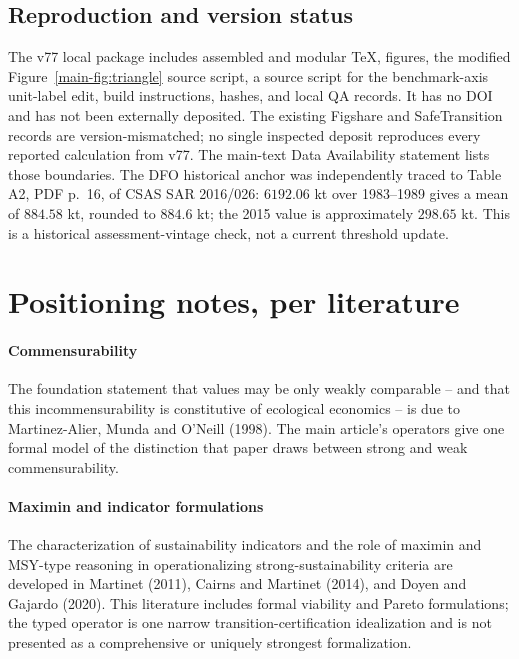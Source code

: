 \subsection{Reproduction and version status}

The v77 local package includes assembled and modular TeX, figures, the modified Figure~\ref{main-fig:triangle} source script, a source script for the benchmark-axis unit-label edit, build instructions, hashes, and local QA records. It has no DOI and has not been externally deposited. The existing Figshare and SafeTransition records are version-mismatched; no single inspected deposit reproduces every reported calculation from v77. The main-text Data Availability statement lists those boundaries. The DFO historical anchor was independently traced to Table A2, PDF p.~16, of CSAS SAR 2016/026: $6192.06$ kt over 1983--1989 gives a mean of $884.58$ kt, rounded to $884.6$ kt; the 2015 value is approximately $298.65$ kt. This is a historical assessment-vintage check, not a current threshold update.

\section{Positioning notes, per literature}\label{si:positioning}

\paragraph{Commensurability} The foundation statement that values may be only weakly comparable -- and that this incommensurability is constitutive of ecological economics -- is due to Martinez-Alier, Munda and O'Neill (1998). The main article's operators give one formal model of the distinction that paper draws between strong and weak commensurability.

\paragraph{Maximin and indicator formulations} The characterization of sustainability indicators and the role of maximin and MSY-type reasoning in operationalizing strong-sustainability criteria are developed in Martinet (2011), Cairns and Martinet (2014), and Doyen and Gajardo (2020). This literature includes formal viability and Pareto formulations; the typed operator is one narrow transition-certification idealization and is not presented as a comprehensive or uniquely strongest formalization.

